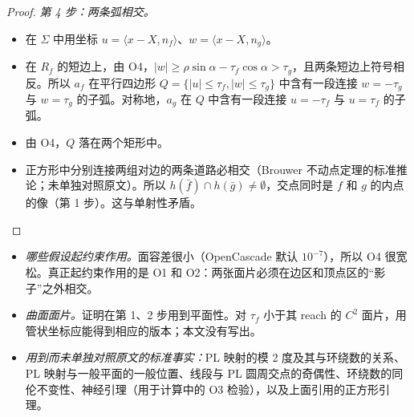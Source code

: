 \begin{proof}
\emph{第 4 步：两条弧相交。}
\begin{itemize}
\item 在 $\Sigma$ 中用坐标 $u=\langle x-X,n_f\rangle$、$w=\langle x-X,n_g\rangle$。
\item 在 $R_f$ 的短边上，由 O4，$|w|\ge\rho\sin\alpha-\tau_f\cos\alpha>\tau_g$，且两条短边上符号相反。所以 $a_f$ 在平行四边形 $Q=\{|u|\le\tau_f,|w|\le\tau_g\}$ 中含有一段连接 $w=-\tau_g$ 与 $w=\tau_g$ 的子弧。对称地，$a_g$ 在 $Q$ 中含有一段连接 $u=-\tau_f$ 与 $u=\tau_f$ 的子弧。
\item 由 O4，$Q$ 落在两个矩形中。
\item 正方形中分别连接两组对边的两条道路必相交（Brouwer 不动点定理的标准推论；未单独对照原文）。所以 $h(\bar f)\cap h(\bar g)\ne\emptyset$，交点同时是 $f$ 和 $g$ 的内点的像（第 1 步）。这与单射性矛盾。
\end{itemize}
\end{proof}

\begin{remark}
\begin{itemize}
\item \emph{哪些假设起约束作用。}面容差很小（OpenCascade 默认 $10^{-7}$），所以 O4 很宽松。真正起约束作用的是 O1 和 O2：两张面片必须在边区和顶点区的``影子''之外相交。
\item \emph{曲面面片。}证明在第 1、2 步用到平面性。对 $\tau_f$ 小于其 reach 的 $C^2$ 面片，用管状坐标应能得到相应的版本；本文没有写出。
\item \emph{用到而未单独对照原文的标准事实：}PL 映射的模 2 度及其与环绕数的关系、PL 映射与一般平面的一般位置、线段与 PL 圆周交点的奇偶性、环绕数的同伦不变性、神经引理（用于计算中的 O3 检验），以及上面引用的正方形引理。
\end{itemize}
\end{remark}
